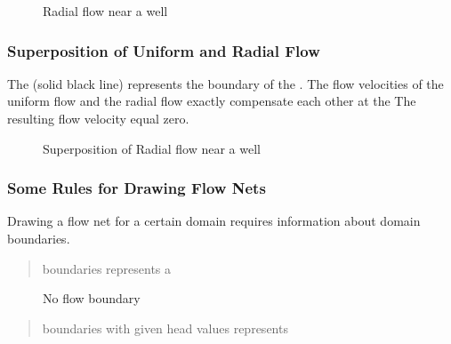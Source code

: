 \documentclass[letterpaper,10pt,english]{sphinxmanual}
\begin{document}
\begin{figure}[htbp]
\centering
\capstart

\noindent{}
\caption{Radial flow near a well}\label{\detokenize{contents/flow/lecture_06/16_darcy_law_3D:id1}}\end{figure}


\subsubsection{Superposition of Uniform and Radial Flow}
\label{\detokenize{contents/flow/lecture_06/16_darcy_law_3D:superposition-of-uniform-and-radial-flow}}
The  (solid black line) represents the boundary of the . The flow velocities of the uniform flow and the radial flow exactly compensate each other at the  The resulting flow velocity equal zero.

\begin{figure}[htbp]
\centering
\capstart

\noindent{}
\caption{Superposition of Radial flow near a well}\label{\detokenize{contents/flow/lecture_06/16_darcy_law_3D:radial-flow}}\end{figure}


\subsubsection{Some Rules for Drawing Flow Nets}
\label{\detokenize{contents/flow/lecture_06/16_darcy_law_3D:some-rules-for-drawing-flow-nets}}
Drawing a flow net for a certain domain requires information about domain boundaries.
\begin{quote}

 boundaries represents a 
\end{quote}

\begin{figure}[htbp]
\centering
\capstart

\noindent{}
\caption{No flow boundary}\label{\detokenize{contents/flow/lecture_06/16_darcy_law_3D:flow-net}}\end{figure}
\begin{quote}

 boundaries with given head values represents 
\end{quote}
\end{document}
